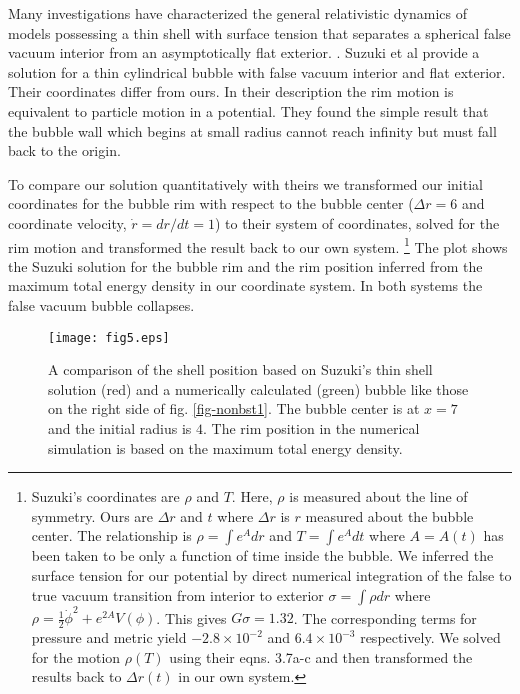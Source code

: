 \documentclass[preprintnumbers,eqsecnum,aps,prd,epsf,showpacs,nofootinbib
]{revtex4}
\begin{document}
Many investigations have characterized the general relativistic
dynamics of models possessing a thin shell with surface tension that
separates a spherical false vacuum interior from an asymptotically
flat exterior.
\cite{Berezin:1982ur,Maeda:1985ye,Sato:1986xxxx,Blau:1986cw,Berezin:1987bc,Aurilia:1989sb}. Suzuki
et al \cite{Suzuki:1991yk} provide a solution for a thin
cylindrical bubble with false vacuum interior and flat exterior. Their
coordinates differ from ours. In their description the rim motion is
equivalent to particle motion in a potential. They found the simple
result that the bubble wall which begins at small radius cannot reach
infinity but must fall back to the origin. 

To compare our solution quantitatively with theirs we transformed our
initial coordinates for the bubble rim with respect to the bubble
center ($\Delta r=6$ and coordinate velocity, ${\dot r}=dr/dt=1$) to
their system of coordinates, solved for the rim motion and transformed
the result back to our own system.
\footnote{Suzuki's coordinates are $\rho$ and $T$. Here, $\rho$ is
  measured about the line of symmetry. Ours are $\Delta r$ and $t$
  where $\Delta r$ is $r$ measured about the bubble center.  The
  relationship is $\rho = \int e^A dr$ and $T = \int e^A dt$ where
  $A=A(t)$ has been taken to be only a function of time inside the
  bubble. We inferred the surface tension for our potential by direct
  numerical integration of the false to true vacuum transition from
  interior to exterior $ \sigma = \int \rho dr$ where $\rho =
  \frac{1}{2}{\dot \phi}^2 + e^{2A} V(\phi)$. This gives $G \sigma =
  1.32$. The corresponding terms for pressure and metric yield $-2.8
  \times 10^{-2}$ and $6.4 \times 10^{-3}$ respectively.  We solved
  for the motion $\rho(T)$ using their eqns. 3.7a-c and then
  transformed the results back to $\Delta r(t)$ in our own system.}
The plot shows the Suzuki solution for the bubble rim and the rim
position inferred from the maximum total energy density in our
coordinate system. In both systems the false vacuum bubble collapses.
\begin{figure}[htbp]
\begin{center}
\texttt{[image: fig5.eps]}
\end{center}
\caption{A comparison of the shell position based on Suzuki's thin
  shell solution (red) and a numerically calculated (green) bubble
  like those on the right side of fig. \ref{fig-nonbst1}. The bubble
  center is at $x=7$ and the initial radius is $4$. The rim position
  in the numerical simulation is based on the maximum total energy
  density.
\label{isolated-bubble}}
\end{figure}
\end{document}
